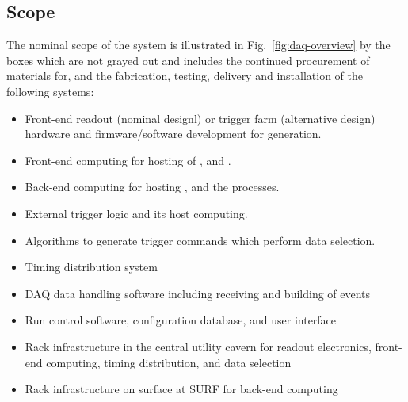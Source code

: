 




\subsection{Scope}
\label{sec:fd-daq-scope}


The nominal scope of the  system is illustrated in
Fig.~\ref{fig:daq-overview} by the boxes which are not grayed out and
includes the continued procurement of materials for, and the
fabrication, testing, delivery and installation of the following
systems:

\begin{itemize}
\item Front-end readout (nominal designl) or trigger farm (alternative
  design) hardware and firmware/software development for
   generation.
\item Front-end computing for hosting of ,  and .
\item Back-end computing for hosting ,  and the  processes.
\item External trigger logic and its host computing.
\item Algorithms to generate trigger commands which perform data selection.
\item Timing distribution system
\item DAQ data handling software including receiving and building of
  events
\item Run control software, configuration database, and user interface
\item Rack infrastructure in the central utility cavern for readout
  electronics, front-end computing, timing distribution, and data
  selection
\item Rack infrastructure on surface at SURF for back-end computing
\end{itemize}


